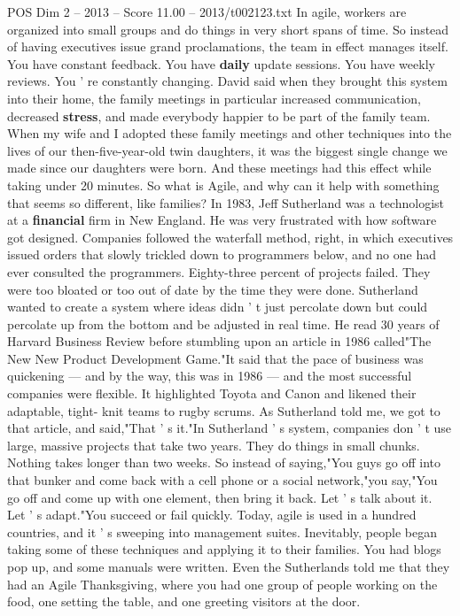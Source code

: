 \begin{textsample}{POS Dim 2 – 2013 – Score 11.00 – 2013/t002123.txt}
In agile, workers are organized into small groups and do things in very short spans of time.
So instead of having executives issue grand proclamations, the team in effect manages itself.
You have constant feedback.
You have \textbf{daily} update sessions.
You have weekly reviews.
You ' re constantly changing.
David said when they brought this system into their home, the family meetings in particular increased communication, decreased \textbf{stress}, and made everybody happier to be part of the family team.
When my wife and I adopted these family meetings and other techniques into the lives of our then-five-year-old twin daughters, it was the biggest single change we made since our daughters were born.
And these meetings had this effect while taking under 20 minutes.
So what is Agile, and why can it help with something that seems so different, like families?
In 1983, Jeff Sutherland was a technologist at a \textbf{financial} firm in New England.
He was very frustrated with how software got designed.
Companies followed the waterfall method, right, in which executives issued orders that slowly trickled down to programmers below, and no one had ever consulted the programmers.
Eighty-three percent of projects failed.
They were too bloated or too out of date by the time they were done.
Sutherland wanted to create a system where ideas didn ' t just percolate down but could percolate up from the bottom and be adjusted in real time.
He read 30 years of Harvard Business Review before stumbling upon an article in 1986 called"The New New Product Development Game."It said that the pace of business was quickening — and by the way, this was in 1986 — and the most successful companies were flexible.
It highlighted Toyota and Canon and likened their adaptable, tight- knit teams to rugby scrums.
As Sutherland told me, we got to that article, and said,"That ' s it."In Sutherland ' s system, companies don ' t use large, massive projects that take two years.
They do things in small chunks.
Nothing takes longer than two weeks.
So instead of saying,"You guys go off into that bunker and come back with a cell phone or a social network,"you say,"You go off and come up with one element, then bring it back.
Let ' s talk about it.
Let ' s adapt."You succeed or fail quickly.
Today, agile is used in a hundred countries, and it ' s sweeping into management suites.
Inevitably, people began taking some of these techniques and applying it to their families.
You had blogs pop up, and some manuals were written.
Even the Sutherlands told me that they had an Agile Thanksgiving, where you had one group of people working on the food, one setting the table, and one greeting visitors at the door.

\end{textsample}
